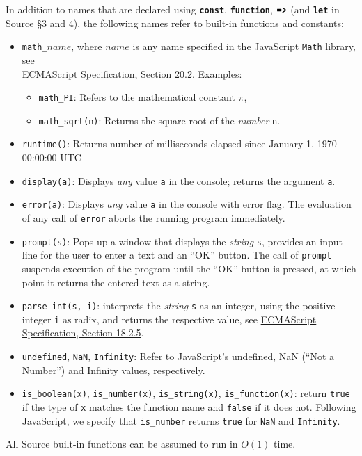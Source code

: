 In addition to names that
are declared using \texttt{\textbf{const}}, \texttt{\textbf{function}},
$\texttt{\textbf{=>}}$ (and \texttt{\textbf{let}} in Source \S3 and 4), the following
names refer to built-in functions and constants:
\begin{itemize}
\item \lstinline{math_}$\textit{name}$,
where $\textit{name}$ is any name specified in the
JavaScript
\texttt{Math} library, see\\
\href{https://www.ecma-international.org/ecma-262/9.0/index.html#sec-math-object}{\color{DarkBlue}ECMAScript Specification, Section 20.2}. Examples:
\begin{itemize}
\item \verb#math_PI#: Refers to the mathematical constant $\pi$,
\item \verb#math_sqrt#\texttt{(n)}: Returns the square root of the \emph{number} \texttt{n}.
\end{itemize}
\item \texttt{runtime()}: Returns number of milliseconds elapsed since January 1, 1970 00:00:00 UTC
\item \texttt{display(a)}: Displays \emph{any} value \texttt{a} in the console; returns the argument \texttt{a}.
\item \texttt{error(a)}: Displays \emph{any} value \texttt{a} in the console with error flag. The evaluation
  of any call of \texttt{error} aborts the running program immediately.
\item \texttt{prompt(s)}: Pops up a window that displays the \emph{string} \texttt{s}, provides
an input line for the user to enter a text and an ``OK'' button. The call of \texttt{prompt}
suspends execution of the program until the ``OK'' button is pressed, at which point it
returns the entered text as a string.
\item \verb#parse_int#\texttt{(s, i)}:
interprets the \emph{string} \texttt{s} as an integer, using the positive integer \texttt{i} as radix, and returns the respective value,
see \href{https://www.ecma-international.org/ecma-262/9.0/index.html#sec-parseint-string-radix}{\color{DarkBlue}ECMAScript Specification, Section 18.2.5}.
\item \verb#undefined#, \verb#NaN#, \verb#Infinity#: Refer to JavaScript's undefined,
NaN (``Not a Number'') and Infinity values, respectively.
\item \verb#is_boolean#\texttt{(x)}, \verb#is_number#\texttt{(x)}, \verb#is_string#\texttt{(x)}, \verb#is_function#\texttt{(x)}:
        return \texttt{true} if the type of \texttt{x} matches the function name and \texttt{false} if it does not. Following
  JavaScript, we specify that \verb#is_number# returns \texttt{true} for \texttt{NaN} and \texttt{Infinity}.
\end{itemize}
All Source built-in functions can be assumed to run in $O(1)$ time.
